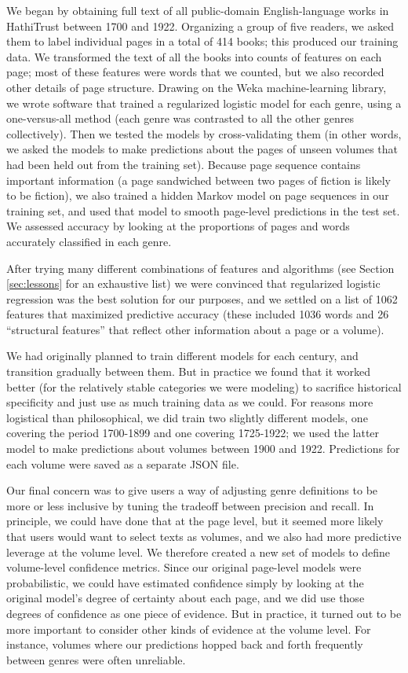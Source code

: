 \documentclass[paper=a4, fontsize=12pt]{scrartcl}
\numberwithin{equation}{section}		%
\numberwithin{figure}{section}			%
\numberwithin{table}{section}				%
\begin{document}
We began by obtaining full text of all public-domain English-language works in HathiTrust between 1700 and 1922. Organizing a group of five readers, we asked them to label individual pages in a total of 414 books; this produced our training data. We transformed the text of all the books into counts of features on each page; most of these features were words that we counted, but we also recorded other details of page structure. Drawing on the Weka machine-learning library, we wrote software that trained a regularized logistic model for each genre, using a one-versus-all method (each genre was contrasted to all the other genres collectively). Then we tested the models by cross-validating them (in other words, we asked the models to make predictions about the pages of unseen volumes that had been held out from the training set). Because page sequence contains important information (a page sandwiched between two pages of fiction is likely to be fiction), we also trained a hidden Markov model on page sequences in our training set, and used that model to smooth page-level predictions in the test set. We assessed accuracy by looking at the proportions of pages and words accurately classified in each genre.

After trying many different combinations of features and algorithms (see Section \ref{sec:lessons} for an exhaustive list) we were convinced that regularized logistic regression was the best solution for our purposes, and we settled on a list of 1062 features that maximized predictive accuracy (these included 1036 words and 26 ``structural features'' that reflect other information about a page or a volume).

We had originally planned to train different models for each century, and transition gradually between them. But in practice we found that it worked better (for the relatively stable categories we were modeling) to sacrifice historical specificity and just use as much training data as we could. For reasons more logistical than philosophical, we did train two slightly different models, one covering the period 1700-1899 and one covering 1725-1922; we used the latter model to make predictions about volumes between 1900 and 1922. Predictions for each volume were saved as a separate JSON file.

Our final concern was to give users a way of adjusting genre definitions to be more or less inclusive by tuning the tradeoff between precision and recall. In principle, we could have done that at the page level, but it seemed more likely that users would want to select texts as volumes, and we also had more predictive leverage at the volume level. We therefore created a new set of models to define volume-level confidence metrics. Since our original page-level models were probabilistic, we could have estimated confidence simply by looking at the original model's degree of certainty about each page, and we did use those degrees of confidence as one piece of evidence. But in practice, it turned out to be more important to consider other kinds of evidence at the volume level. For instance, volumes where our predictions hopped back and forth frequently between genres were often unreliable.
\end{document}
